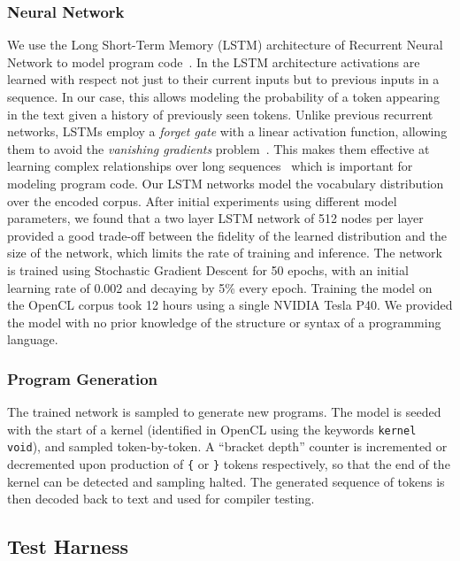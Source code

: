 \subsubsection{Neural Network}

We use the Long Short-Term Memory (LSTM) architecture of Recurrent Neural
Network to model program code~\cite{Hochreiter1997}. In the LSTM architecture
activations are learned with respect not just to their current inputs but to
previous inputs in a sequence. In our case, this allows modeling the probability
of a token appearing in the text given a history of previously seen tokens.
Unlike previous recurrent networks, LSTMs employ a \emph{forget gate} with a
linear activation function, allowing them to avoid the \emph{vanishing
gradients} problem~\cite{Pacanu2013}. This makes them effective at learning
complex relationships over long sequences~\cite{Lipton2015} which is important
for modeling program code. Our LSTM networks model the vocabulary distribution
over the encoded corpus. After initial experiments using different model
parameters, we found that a two layer LSTM network of 512 nodes per layer
provided a good trade-off between the fidelity of the learned distribution and
the size of the network, which limits the rate of training and inference. The
network is trained using Stochastic Gradient Descent for 50 epochs, with an
initial learning rate of 0.002 and decaying by 5\% every epoch. Training the
model on the OpenCL corpus took 12 hours using a single NVIDIA Tesla P40. We
provided the model with no prior knowledge of the structure or syntax of a
programming language.

\subsubsection{Program Generation}

The trained network is sampled to generate new programs. The model is seeded
with the start of a kernel (identified in OpenCL using the keywords
\texttt{kernel void}), and sampled token-by-token. A ``bracket depth'' counter
is incremented or decremented upon production of \texttt{\{} or \texttt{\}}
tokens respectively, so that the end of the kernel can be detected and sampling
halted. The generated sequence of tokens is then decoded back to text and used
for compiler testing.


\subsection{Test Harness\label{sec:test-harness}}


